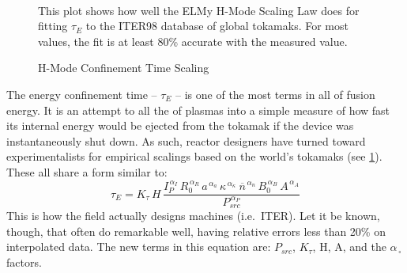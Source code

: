 \begin{figure}
	\centering
	\begin{adjustbox}{width=0.75\textwidth}
		
	\end{adjustbox}
	\caption{H-Mode Confinement Time Scaling} ~\\
	\small This plot shows how well the ELMy H-Mode Scaling Law does for fitting $\tau_E$ to the ITER98 database of global tokamaks. For most values, the fit is at least 80\% accurate with the measured value.
	\label{fig:elmy}
\end{figure}

The energy confinement time -- $\tau_E$ -- is one of the most  terms in all of fusion energy. It is an attempt to  all the  of plasmas into a simple measure of how fast its internal energy would be ejected from the tokamak if the device was instantaneously shut down. As such, reactor designers have turned toward experimentalists for empirical scalings based on the world's tokamaks (see \cref{fig:elmy}). These all share a form similar to:
\begin{equation}
	\tau_E = K_\tau \, H \, \frac{
		I_P^{\,\alpha_I} \, R_0^{\,\alpha_R} \, a^{\,\alpha_a} \, \kappa^{\,\alpha_\kappa} \ \overline{n}^{\,\alpha_n} \, B_0^{\,\alpha_B} \, A^{\,\alpha_A}
	}{ P_{src} ^ {\,\alpha_P} }
	\label{eq:tau_gen}
\end{equation}
This  is how the field actually designs machines (i.e.\ ITER). Let it be known, though, that  often do remarkable well, having relative errors less than 20\% on interpolated data. The new terms in this equation are: $P_{src}$, $K_\tau$, H, A, and the $\alpha_{\,\square}$ factors. 

